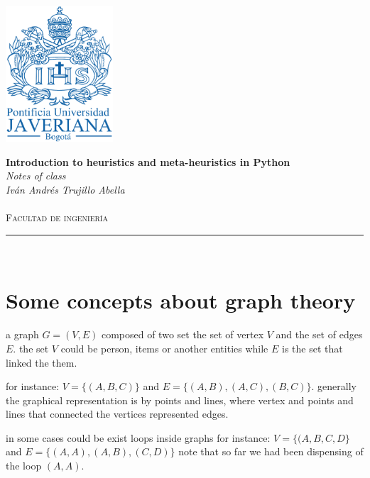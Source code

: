 \documentclass[10pt,a4paper]{article}
\author{Iván Andrés Trujillo }
\begin{document}
\newcommand{\HRule}{\rule{\linewidth}{0.5mm}}


\includegraphics[width = 4cm]{pujshield.eps}\\[0.5cm] 

\begin{center} 
\textbf{\LARGE Introduction to heuristics and meta-heuristics  in Python}\\[0.2cm]
\emph{\LARGE Notes of class}\\[0.3cm] 
\emph{Iván Andrés Trujillo Abella} \\
\textsc{\Large 
}\\[0.2cm] 
\textsc{\large Facultad de ingeniería}\\[0.5cm] 
\HRule \\[0.4cm]
\end{center}
\vspace{1cm}




\section{Some concepts about graph theory}
a graph $G = (V,E) $ composed of two set the set of vertex $V$ and the set of edges $E$.
the set $V$ could be person, items or another entities while $E$ is the set that linked the them.

for instance:
$V = \{ (A,B,C) \}$ and $E =  \{ (A,B), (A,C), (B,C) \}$.
generally the graphical representation is by points and lines, where vertex and points and lines that connected the vertices represented edges.

in some cases could be exist loops inside graphs for instance:
$V = \{ (A,B,C,D \}$ and $E = \{ (A,A), (A,B),(C,D) \}$ note that so far we had been dispensing of the loop $(A,A)$.
\end{document}
